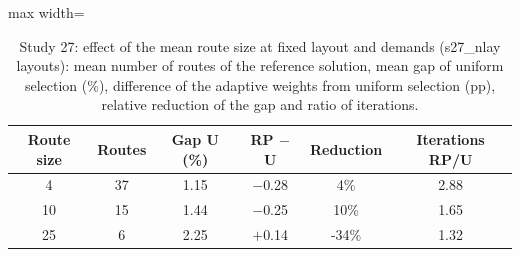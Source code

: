 \begin{table}[t]
\caption{Study 27: effect of the mean route size at fixed layout and demands (\num{s27_nlay} layouts): mean number of routes of the reference solution, mean gap of uniform selection (\%), difference of the adaptive weights from uniform selection (pp), relative reduction of the gap and ratio of iterations.}\label{tab:s27a}
\centering
\small
\begin{adjustbox}{max width=\linewidth}
\begin{tabular}{cccccc}
\toprule
Route size & Routes & Gap U (\%) & RP $-$ U & Reduction & Iterations RP/U \\
\midrule
4 & 37 & 1.15 & $-$0.28 & 4\% & 2.88 \\
10 & 15 & 1.44 & $-$0.25 & 10\% & 1.65 \\
25 & 6 & 2.25 & $+$0.14 & -34\% & 1.32 \\
\bottomrule
\end{tabular}
\end{adjustbox}
\end{table}
